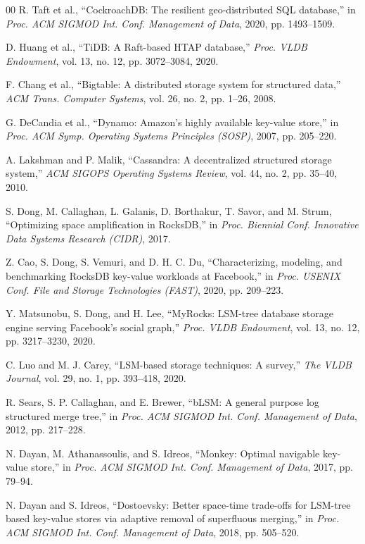 \documentclass[conference, a4paper]{IEEEtran}
\begin{document}
\begin{thebibliography}{00}
R. Taft et al., ``CockroachDB: The resilient geo-distributed SQL
database,'' in \textit{Proc. ACM SIGMOD Int. Conf. Management of Data},
2020, pp. 1493--1509.

D. Huang et al., ``TiDB: A Raft-based HTAP database,''
\textit{Proc. VLDB Endowment}, vol. 13, no. 12, pp. 3072--3084, 2020.

F. Chang et al., ``Bigtable: A distributed storage system for structured
data,'' \textit{ACM Trans. Computer Systems}, vol. 26, no. 2, pp. 1--26,
2008.

G. DeCandia et al., ``Dynamo: Amazon's highly available key-value
store,'' in \textit{Proc. ACM Symp. Operating Systems Principles
(SOSP)}, 2007, pp. 205--220.

A. Lakshman and P. Malik, ``Cassandra: A decentralized structured
storage system,'' \textit{ACM SIGOPS Operating Systems Review}, vol. 44,
no. 2, pp. 35--40, 2010.

S. Dong, M. Callaghan, L. Galanis, D. Borthakur, T. Savor, and
M. Strum, ``Optimizing space amplification in RocksDB,'' in \textit{Proc.
Biennial Conf. Innovative Data Systems Research (CIDR)}, 2017.

Z. Cao, S. Dong, S. Vemuri, and D. H. C. Du, ``Characterizing, modeling,
and benchmarking RocksDB key-value workloads at Facebook,'' in
\textit{Proc. USENIX Conf. File and Storage Technologies (FAST)}, 2020,
pp. 209--223.

Y. Matsunobu, S. Dong, and H. Lee, ``MyRocks: LSM-tree database storage
engine serving Facebook's social graph,'' \textit{Proc. VLDB
Endowment}, vol. 13, no. 12, pp. 3217--3230, 2020.

C. Luo and M. J. Carey, ``LSM-based storage techniques: A survey,''
\textit{The VLDB Journal}, vol. 29, no. 1, pp. 393--418, 2020.

R. Sears, S. P. Callaghan, and E. Brewer, ``bLSM: A general purpose log
structured merge tree,'' in \textit{Proc. ACM SIGMOD Int. Conf.
Management of Data}, 2012, pp. 217--228.

N. Dayan, M. Athanassoulis, and S. Idreos, ``Monkey: Optimal navigable
key-value store,'' in \textit{Proc. ACM SIGMOD Int. Conf. Management of
Data}, 2017, pp. 79--94.

N. Dayan and S. Idreos, ``Dostoevsky: Better space-time trade-offs for
LSM-tree based key-value stores via adaptive removal of superfluous
merging,'' in \textit{Proc. ACM SIGMOD Int. Conf. Management of Data},
2018, pp. 505--520.


\end{thebibliography}
\end{document}
